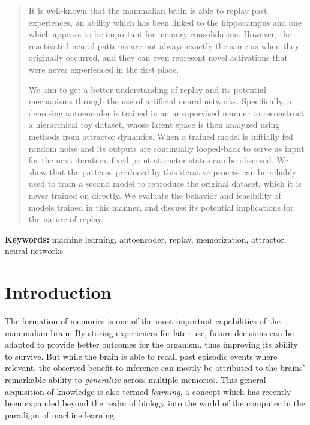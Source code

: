 \documentclass[11pt]{article}
\theoremstyle{remark}
\begin{document}
\begin{abstract}
  It is well-known that the mammalian brain is able to replay past experiences, an ability which has been linked to the hippocampus and one which appears to be important for memory consolidation. However, the reactivated neural patterns are not always exactly the same as when they originally occurred, and they can even represent novel activations that were never experienced in the first place.

  We aim to get a better understanding of replay and its potential mechanisms through the use of artificial neural networks. Specifically, a denoising autoencoder is trained in an unsupervised manner to reconstruct a hierarchical toy dataset, whose latent space is then analyzed using methods from attractor dynamics. When a trained model is initially fed random noise and its outputs are continually looped-back to serve as input for the next iteration, fixed-point attractor states can be observed. We show that the patterns produced by this iterative process can be reliably used to train a second model to reproduce the original dataset, which it is never trained on directly. We evaluate the
  behavior and feasibility of models trained in this manner, and discuss its potential implications for the nature of replay.
\end{abstract}

\vspace{.3cm}

\small{\textbf{Keywords:} machine learning, autoencoder, replay, memorization, attractor, neural networks}
\clearpage

\tableofcontents
\clearpage

\section{Introduction}

The formation of memories is one of the most important capabilities of the mammalian brain. By storing experiences for later use, future decisions can be adapted to provide better outcomes for the organism, thus improving its ability to survive. But while the brain is able to recall past episodic events where relevant, the observed benefit to inference can mostly be attributed to the brains' remarkable ability to \textit{generalize} across multiple memories. This general acquisition of knowledge is also termed \textit{learning}, a concept which has recently been expanded beyond the realm of biology into the world of the computer in the paradigm of machine learning.
\end{document}
